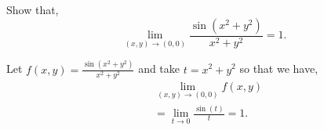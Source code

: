 \begin{exmp}
	Show that,
	\[
		\lim_{(x,y) \to (0,0)} \frac{\sin(x^2 +y^2)}{x^2 + y^2} = 1.
	\]

	Let $f(x,y) = \frac{\sin(x^2 + y^2)}{x^2 + y^2}$ and take $t=x^2 + y^2$
	so that we have,
	\begin{align*}
		& \lim_{(x,y) \to (0,0)} f(x,y)
		\\
		&= \lim_{t \to 0} \frac{\sin(t)}{t} = 1.
	\end{align*}
\end{exmp}
